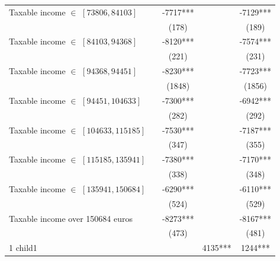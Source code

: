 \begin{subappendices}
\begin{table}[H]
{\begin{tabular}{lcccc}
Taxable income $\in$ $[73806,84103]$    &               & -7717***      &               & -7129***               \\   
                                        &               & (178)         &               & (189)                  \\   
Taxable income $\in$ $[84103,94368]$    &               & -8120***      &               & -7574***               \\   
                                        &               & (221)         &               & (231)                  \\   
Taxable income $\in$ $[94368,94451]$    &               & -8230***      &               & -7723***               \\   
                                        &               & (1848)        &               & (1856)                 \\   
Taxable income $\in$ $[94451,104633]$   &               & -7300***      &               & -6942***               \\   
                                        &               & (282)         &               & (292)                  \\   
Taxable income $\in$ $[104633,115185]$  &               & -7530***      &               & -7187***               \\   
                                        &               & (347)         &               & (355)                  \\   
Taxable income $\in$ $[115185,135941]$  &               & -7380***      &               & -7170***               \\   
                                        &               & (338)         &               & (348)                  \\   
Taxable income $\in$ $[135941,150684]$  &               & -6290***      &               & -6110***               \\   
                                        &               & (524)         &               & (529)                  \\   
Taxable income over 150684 euros        &               & -8273***      &               & -8167***               \\   
                                        &               & (473)         &               & (481)                  \\
\midrule   
1 child1                                &               &               & 4135***       & 1244***               \\     

\end{tabular}}
\end{table}
\end{subappendices}
